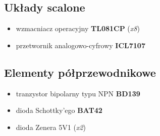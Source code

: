 \documentclass[12pt]{article}
\begin{document}
\subsection{Układy scalone}
\begin{itemize}
	\item wzmacniacz operacyjny \textbf{TL081CP} (\textit{x8})
	\item przetwornik analogowo-cyfrowy \textbf{ICL7107}
\end{itemize}
\subsection{Elementy półprzewodnikowe}
\begin{itemize}
	\item tranzystor bipolarny typu NPN \textbf{BD139}
	\item dioda Schottky'ego \textbf{BAT42} 
	\item dioda Zenera 5V1 (\textit{x2})
\end{itemize}
\end{document}
